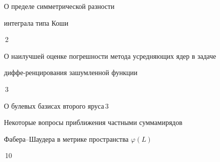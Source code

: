 

{О пределе симметрической разности 


интеграла типа Коши}{\No\,2}




{О наилучшей оценке погрешности метода усредняющих ядер в задаче


диффе-\newline ренцирования зашумленной функции}{\No\,3}




{О булевых базисах второго яруса}{\No\,3}




{Некоторые вопросы приближения частными суммами\newline рядов


Фабера--Шаудера в метрике пространства $\varphi(L)$}{\No\,10}














\bigskip































\bigskip



































